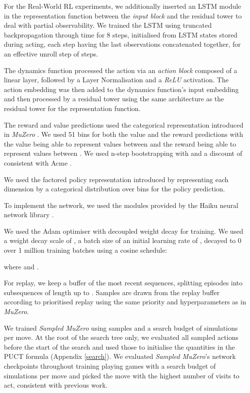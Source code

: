 \documentclass{article}
\newcommand{\muzero}{\emph{MuZero}}
\newcommand{\smuzero}{\emph{Sampled MuZero}}
\newcommand{\rwrl}{Real-World RL }
\begin{document}
For the \rwrl experiments, we additionally inserted an LSTM module \cite{lstm} in the representation function between the \emph{input block} and the residual tower to deal with partial observability. We trained the LSTM using truncated backpropagation through time for 8 steps, initialised from LSTM states stored during acting, each step having the last  observations concatenated together, for an effective unroll step of  steps.

The dynamics function processed the action via an \emph{action block} composed of a linear layer, followed by a Layer Normalisation and a \emph{ReLU} activation. The action embedding was then added to the dynamics function's input embedding and then processed by a residual tower using the same architecture as the residual tower for the representation function.

The reward and value predictions used the categorical representation introduced in \muzero{} \cite{muzero}. We used 51 bins for both the value and the reward predictions with the value being able to represent values between  and the reward being able to represent values between . We used n-step bootstrapping with  and a discount of  consistent with Acme \cite{hoffman2020acme}.

We used the factored policy representation introduced by \cite{tang2020discretizing} representing each dimension by a categorical distribution over  bins for the policy prediction.

To implement the network, we used the modules provided by the Haiku neural network library \cite{haiku2020github}.

We used the Adam optimiser \cite{adam} with decoupled weight decay \cite{adam_weight_decay} for training. We used a weight decay scale of , a batch size of  an initial learning rate of , decayed to 0 over 1 million training batches using a cosine schedule:



where  and .

For replay, we keep a buffer of the most recent  sequences, splitting episodes into subsequences of length up to . Samples are drawn from the replay buffer according to prioritised replay \cite{Schaul2016} using the same priority and hyperparameters as in \muzero{}.

We trained \smuzero{} using  samples and a search budget of  simulations per move. At the root of the search tree only, we evaluated all sampled actions before the start of the search and used those to initialise the  quantities in the PUCT formula (Appendix \ref{search}). We evaluated \smuzero{}'s network checkpoints throughout training playing  games with a search budget of  simulations per move and picked the move with the highest number of visits to act, consistent with previous work.
\end{document}
